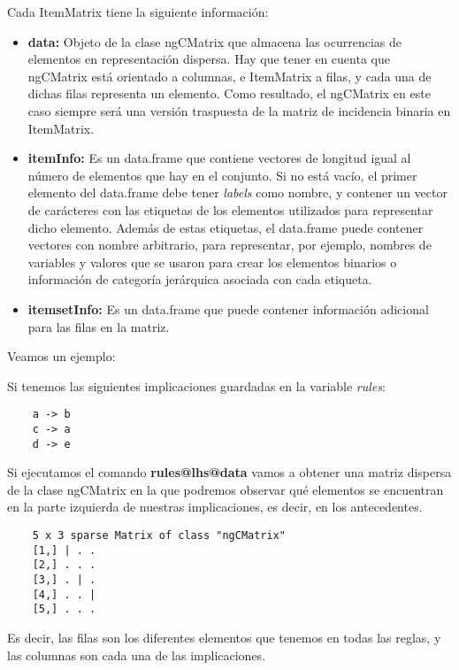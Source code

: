 Cada ItemMatrix tiene la siguiente informaci\'on:
\begin{itemize}

    \item \textbf{data:}
    Objeto de la clase ngCMatrix que almacena las ocurrencias de elementos en 
    representaci\'on dispersa. Hay que tener en cuenta que ngCMatrix est\'a orientado 
    a columnas, e ItemMatrix a filas, y cada una de dichas filas representa un elemento.
    Como resultado, el ngCMatrix en este caso siempre ser\'a una versi\'on traspuesta 
    de la matriz de incidencia binaria en ItemMatrix.

    \item \textbf{itemInfo:}
    Es un data.frame que contiene vectores de longitud igual al n\'umero de elementos que 
    hay en el conjunto. Si no est\'a vac\'io, el primer elemento del data.frame debe tener 
    \textit{labels} como nombre, y contener un vector de car\'acteres con las etiquetas de los 
    elementos utilizados para representar dicho elemento. Adem\'as de estas etiquetas, el 
    data.frame puede contener vectores con nombre arbitrario, para representar, por ejemplo, 
    nombres de variables y valores que se usaron para crear los elementos binarios o 
    informaci\'on de categor\'ia jer\'arquica asociada con cada etiqueta.


    \item \textbf{itemsetInfo:}
    Es un data.frame que puede contener informaci\'on adicional para las filas en la matriz.

\end{itemize}


Veamos un ejemplo:

Si tenemos las siguientes implicaciones guardadas en la variable \textit{rules}:
\begin{verbatim}
    a -> b
    c -> a
    d -> e
\end{verbatim}


Si ejecutamos el comando \textbf{rules@lhs@data} vamos a obtener una matriz dispersa de la clase 
ngCMatrix en la que podremos observar qu\'e elementos se encuentran en la parte izquierda de 
nuestras implicaciones, es decir, en los antecedentes.

\begin{verbatim}
    5 x 3 sparse Matrix of class "ngCMatrix"
    [1,] | . .
    [2,] . . .
    [3,] . | .
    [4,] . . |
    [5,] . . .
\end{verbatim}

Es decir, las filas son los diferentes elementos que tenemos en todas las reglas, y las 
columnas son cada una de las implicaciones.

